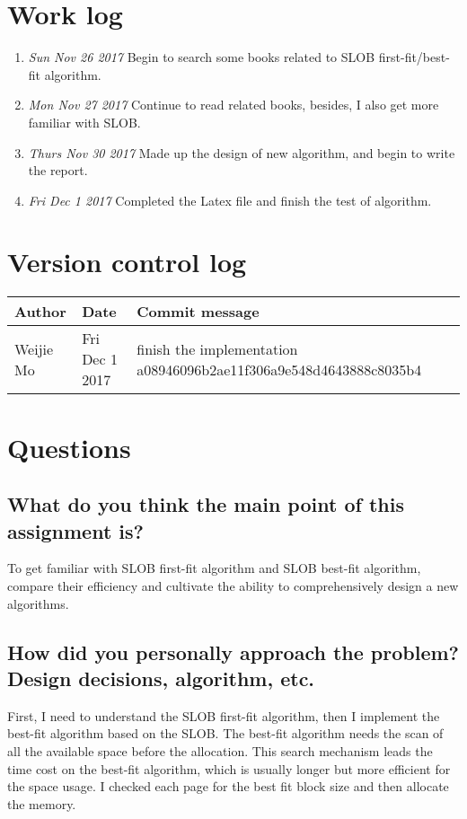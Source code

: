 \documentclass[10pt,draftclsnofoot,peerreview,letterpaper,onecolumn,]{IEEEtran}
\begin{document}
\section{Work log}
\begin{enumerate}
\item \emph{Sun Nov 26 2017} Begin to search some books related to SLOB first-fit/best-fit algorithm.
\item \emph{Mon Nov 27 2017} Continue to read related books, besides, I also get more familiar with SLOB.
\item \emph{Thurs Nov 30 2017} Made up the design of new algorithm, and begin to write the report.
\item \emph{Fri Dec 1 2017} Completed the Latex file and finish the test of algorithm.
\end{enumerate}


\section{Version control log}

\begin{table}[h]
\centering
\begin{tabular}{|l|l|l|l|}
\hline

Author    & Date & Commit message
\\ \hline
Weijie Mo & Fri Dec 1 2017 & finish the implementation   a08946096b2ae11f306a9e548d4643888c8035b4
\\ \hline

\end{tabular}
\end{table}

\section{Questions}
\subsection{What do you think the main point of this assignment is?}
To get familiar with SLOB first-fit algorithm and SLOB best-fit algorithm, compare their efficiency and cultivate the ability to comprehensively design a new algorithms.

\subsection{How did you personally approach the problem? Design decisions, algorithm, etc.}
First, I need to understand the SLOB first-fit algorithm, then I implement the best-fit algorithm based on the SLOB. The best-fit algorithm needs the scan of all the available space before the allocation. This search mechanism leads the time cost on the best-fit algorithm, which is usually longer but more efficient for the space usage. I checked each page for the best fit block size and then allocate the memory.
\end{document}
